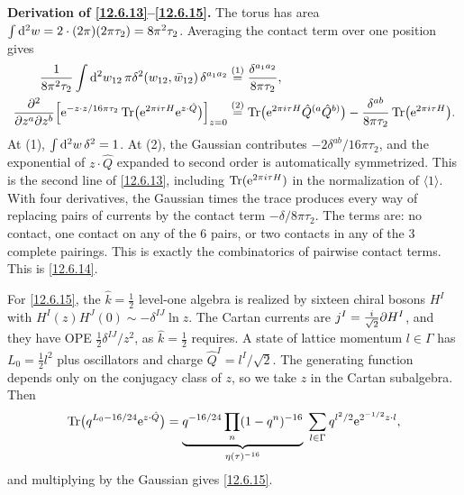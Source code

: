 \begin{tcolorbox}[breakable]
	\begin{remark}
		\textbf{Derivation of \eqref{12.6.13}--\eqref{12.6.15}.} The torus has area $\int\mathrm{d}^{2}w=2\cdot(2\pi)(2\pi\tau_{2})=8\pi^{2}\tau_{2}$. Averaging the contact term over one position gives
		\begin{align*}
			\frac{1}{8\pi^{2}\tau_{2}}\int\mathrm{d}^{2}w_{12}\,\pi\delta^{2}(w_{12},\bar w_{12})\,\delta^{a_1a_2}&\overset{(1)}{=} \frac{\delta^{a_1a_2}}{8\pi\tau_{2}} ,\\
			\frac{\partial^{2}}{\partial z^{a}\partial z^{b}}\Bigl[\mathrm{e}^{-z\cdot z/16\pi\tau_{2}}\operatorname{Tr}\bigl(\mathrm{e}^{2\pi i\tau H}\mathrm{e}^{z\cdot\hat Q}\bigr)\Bigr]_{z=0}
			&\overset{(2)}{=} \operatorname{Tr}\bigl(\mathrm{e}^{2\pi i\tau H}\hat Q^{(a}\hat Q^{b)}\bigr)-\frac{\delta^{ab}}{8\pi\tau_{2}}\operatorname{Tr}\bigl(\mathrm{e}^{2\pi i\tau H}\bigr) .
		\end{align*}
		At (1), $\int\mathrm{d}^{2}w\,\delta^{2}=1$. At (2), the Gaussian contributes $-2\delta^{ab}/16\pi\tau_{2}$, and the exponential of $z\cdot\hat Q$ expanded to second order is automatically symmetrized. This is the second line of \eqref{12.6.13}, including $\operatorname{Tr}(\mathrm{e}^{2\pi i\tau H})$ in the normalization of $\langle1\rangle$. With four derivatives, the Gaussian times the trace produces every way of replacing pairs of currents by the contact term $-\delta/8\pi\tau_{2}$. The terms are: no contact, one contact on any of the $6$ pairs, or two contacts in any of the $3$ complete pairings. This is exactly the combinatorics of pairwise contact terms. This is \eqref{12.6.14}.

		For \eqref{12.6.15}, the $\hat k=\frac12$ level-one algebra is realized by sixteen chiral bosons $H^{I}$ with $H^{I}(z)H^{J}(0)\sim-\delta^{IJ}\ln z$. The Cartan currents are $j^{I}=\frac{i}{\sqrt2}\partial H^{I}$, and they have OPE $\frac12\delta^{IJ}/z^{2}$, as $\hat k=\frac12$ requires. A state of lattice momentum $l\in\Gamma$ has $L_{0}=\frac12l^{2}$ plus oscillators and charge $\hat Q^{I}=l^{I}/\sqrt2$. The generating function depends only on the conjugacy class of $z$, so we take $z$ in the Cartan subalgebra. Then
		\[
		\operatorname{Tr}\bigl(q^{L_{0}-16/24}\mathrm{e}^{z\cdot\hat Q}\bigr)=\underbrace{q^{-16/24}\prod_{n}(1-q^{n})^{-16}}_{\eta(\tau)^{-16}}\;\sum_{l\in\Gamma}q^{l^{2}/2}\mathrm{e}^{2^{-1/2}z\cdot l} ,
		\]
		and multiplying by the Gaussian gives \eqref{12.6.15}.
	\end{remark}
\end{tcolorbox}

